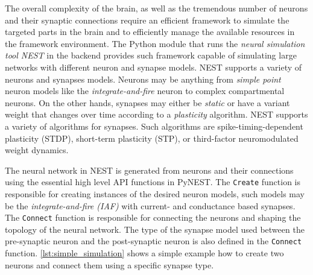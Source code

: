 The overall complexity of the brain, as well as the tremendous number of neurons and their synaptic connections
require an efficient framework to simulate the targeted parts in the brain and to efficiently manage the available resources in the framework environment. The Python module \citep[\emph{PyNEST};][]{10.3389/neuro.11.012.2008} that runs the \emph{neural simulation tool NEST} \citep{Gewaltig:NEST, spreizer_sebastian_2022_6368024} in the backend provides such framework capable of simulating large networks with different neuron and synapse models. NEST supports a variety of neurons and synapses models. Neurons may be anything from \emph{simple point} neuron models like the \emph{integrate-and-fire} neuron to complex compartmental neurons. On the other hands, synapses may either be \emph{static} or have a variant weight that changes over time according to a \emph{plasticity} algorithm. NEST supports a variety of algorithms for synapses. Such algorithms are spike-timing-dependent plasticity (STDP), short-term plasticity (STP), or third-factor neuromodulated weight dynamics.

The neural network in NEST is generated from neurons and their connections using the essential high level API functions in PyNEST. The \texttt{Create} function is responsible for creating instances of the desired neuron models, such models may be the \emph{integrate-and-fire (IAF)}  with current- and conductance based synapses. The \texttt{Connect} function is responsible for connecting the neurons and shaping the topology of the neural network. The type of the synapse model used between the pre-synaptic neuron and the post-synaptic neuron is also defined in the \texttt{Connect} function.  \autoref{lst:simple_simulation} shows a simple example how to create two neurons and connect them using a specific synapse type.
  

